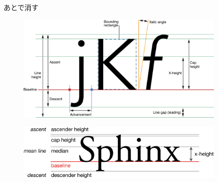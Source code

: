あとで消す

\begin{figure}
    \begin{center}
        \includegraphics[width=10cm]{images/typography_terms_apple.png}
    \end{center}
    \caption{\cite{developer.apple.com:library/archive/documentation/StringsTextFonts/Conceptual/TextAndWebiPhoneOS/Introduction/Introduction.html}}
\end{figure}

\begin{figure}
    \begin{center}
        \includegraphics[width=10cm]{images/typography_terms_wikipedia.png}
    \end{center}
    \caption{\cite{en.wikipedia.org/wiki/File:Typography_Line_Terms.svg}}
\end{figure}

